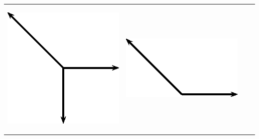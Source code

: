\begin{enumerate}[noitemsep, label=\textbf{\arabic*}. ]
\begin{center}
\begin{xtabular*}{\mytablewidth}[t]{|p{10\mystarwidth}|p{10\mystarwidth}|p{10\mystarwidth}|p{10\mystarwidth}|}
\label{m38819*id197121}
    \begin{center}
    \label{m38819*id197121!!!underscore!!!media}\label{m38819*id197121!!!underscore!!!printimage}\includegraphics[width=300px]{col11305.imgs/m38819_PG11C1_074.png} %
        
      \vspace{2pt}
    \vspace{.1in}
    
    \end{center}



    \addtocounter{footnote}{-0}
     &
    
    
        
    \setcounter{subfigure}{0}

\label{m38819*id197132}
    \begin{center}
    \label{m38819*id197132!!!underscore!!!media}\label{m38819*id197132!!!underscore!!!printimage}\includegraphics[width=300px]{col11305.imgs/m38819_PG11C1_075.png} %
        
      \vspace{2pt}
    \vspace{.1in}
    

\end{center}
\end{xtabular*}
\end{center}
\end{enumerate}
